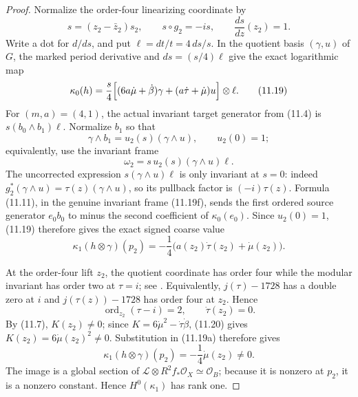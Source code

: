 \begin{proof}
Normalize the order-four linearizing coordinate by
\[
 s=(z_2-\bar z_2)s_2,
 \qquad s\circ g_2=-is,
 \qquad \frac{ds}{dz}(z_2)=1.
\]
Write a dot for $d/ds$, and put
$\ell=dt/t=4\,ds/s$.  In the quotient basis $(\gamma,u)$ of $G$, the
marked period derivative and $ds=(s/4)\ell$ give the exact logarithmic map
\[
 \kappa_0(h)=\frac{s}{4}
 \Bigl[(6a\dot\mu+\dot\beta)\gamma
 +(a\dot\tau+\dot\mu)u\Bigr]\otimes\ell.
\tag{11.19}
\]
For $(m,a)=(4,1)$, the actual invariant target generator from (11.4) is
$s(b_0\wedge b_1)\ell$.  Normalize $b_1$ so that
\[
 \gamma\wedge b_1=u_2(s)(\gamma\wedge u),
 \qquad u_2(0)=1;
\]
equivalently, use the invariant frame
\[
 \omega_2=s\,u_2(s)(\gamma\wedge u)\ell.
\tag{11.19f}
\]
The uncorrected expression $s(\gamma\wedge u)\ell$ is only invariant at
$s=0$: indeed $g_2^*(\gamma\wedge u)=\tau(z)(\gamma\wedge u)$, so its
pullback factor is $(-i)\tau(z)$.  Formula (11.11), in the genuine invariant
frame (11.19f), sends the first ordered source generator $e_0b_0$ to
minus the second coefficient of $\kappa_0(e_0)$.  Since $u_2(0)=1$,
(11.19) therefore gives the exact signed coarse value
\[
 \kappa_1(h\otimes\gamma)(p_2)
 =-\frac14\bigl(a(z_2)\dot\tau(z_2)+\dot\mu(z_2)\bigr).
\tag{11.19a}
\]

At the order-four lift $z_2$, the quotient coordinate has order four while
the modular invariant has order two at $\tau=i$; see
\cite[Chapter~VII]{Serre1973}.  Equivalently,
$j(\tau)-1728$ has a double zero at $i$ and
$j(\tau(z))-1728$ has order four at $z_2$.  Hence
\[
 \operatorname{ord}_{z_2}(\tau-i)=2,\qquad \dot\tau(z_2)=0.
\tag{11.20}
\]
By (11.7), $K(z_2)\ne0$; since
$K=6\dot\mu^2-\dot\tau\dot\beta$, (11.20) gives
$K(z_2)=6\dot\mu(z_2)^2\ne0$.  Substitution in (11.19a) therefore gives
\[
 \kappa_1(h\otimes\gamma)(p_2)=-\frac14\dot\mu(z_2)\ne0.
\tag{11.20a}
\]
The image is a global section of
$\mathcal L\otimes R^2f_*\mathcal O_X\simeq\mathcal O_B$; because it is
nonzero at $p_2$, it is a nonzero constant.  Hence
$H^0(\kappa_1)$ has rank one.
\end{proof}

